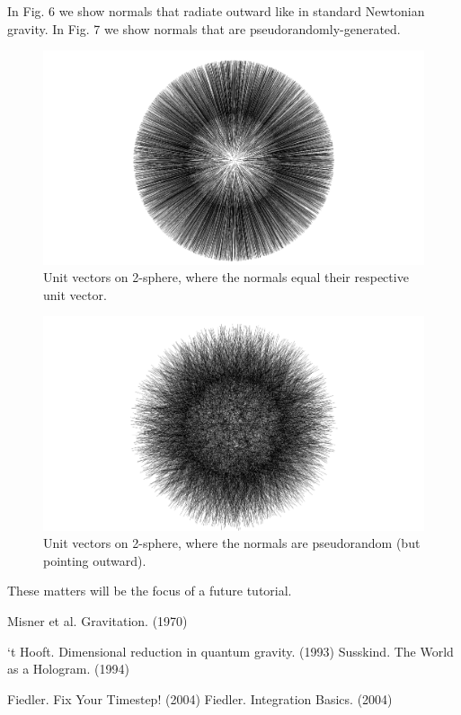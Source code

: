 \documentclass[12pt]{article}
\begin{document}
In Fig. 6 we show normals that radiate outward like in standard Newtonian gravity.
In Fig. 7 we show normals that are pseudorandomly-generated.
\begin{figure} 
\centering
  \includegraphics[width = 4 in]{normals.png}
  \caption{
Unit vectors on 2-sphere, where the normals equal their respective unit vector.
}
\end{figure}
\begin{figure} 
\centering
  \includegraphics[width = 4 in]{rand_normals.png}
  \caption{
Unit vectors on 2-sphere, where the normals are pseudorandom (but pointing outward).
}
\end{figure}


These matters will be the focus of a future tutorial.






\pagebreak







\begin{thebibliography}{9}

 Misner et al. Gravitation. (1970)

 `t Hooft. Dimensional reduction in quantum gravity. (1993)
 Susskind. The World as a Hologram. (1994)

 Fiedler. Fix Your Timestep! (2004)
 Fiedler. Integration Basics. (2004)







\end{thebibliography}
\end{document}
